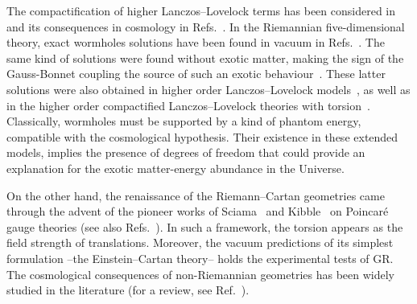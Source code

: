 \documentclass[aps,prd,12pt,superscriptaddress,showpacs,showkeys,longbibliography,reprint,nofootinbib]{revtex4-1}
\begin{document}
The compactification of higher Lanczos--Lovelock terms has been considered in~\cite{MuellerHoissen:1985mm,MuellerHoissen:1989yv} and its consequences in cosmology in Refs.~\cite{MuellerHoissen:1985ij,Deruelle:1986iv,Deruelle:1989fj}. In the Riemannian five-dimensional theory, exact wormholes solutions have been found in vacuum in Refs.~\cite{Dotti:2006cp,Dotti:2007az}. The same kind of solutions were found without exotic matter, making the sign of the Gauss-Bonnet coupling the source of such an exotic behaviour~\cite{Mehdizadeh:2015jra}. These latter solutions were also obtained in higher order Lanczos--Lovelock models~\cite{Mehdizadeh:2015dta}, as well as in the higher order compactified Lanczos--Lovelock theories with torsion~\cite{Canfora:2008ka}. Classically, wormholes must be supported by a kind of phantom energy, compatible with the cosmological hypothesis. Their existence in these extended models, implies the presence of degrees of freedom that could provide an explanation for the exotic matter-energy abundance in the Universe. 

On the other hand, the renaissance of the Riemann--Cartan geometries came through the advent of the pioneer works of Sciama~\cite{Sciama:1962} and Kibble~\cite{Kibble:1961ba} on Poincar\'e gauge theories (see also Refs.~\cite{Hehl:1976kj,Blagojevic:2002du}). In such a framework, the torsion appears as the field strength of translations. %
Moreover, the vacuum predictions of its simplest formulation --the Einstein--Cartan theory-- holds the experimental tests of GR. The cosmological consequences of non-Riemannian geometries has been widely studied in the literature (for a review, see Ref.~\cite{Puetzfeld:2004yg}). %
\end{document}
